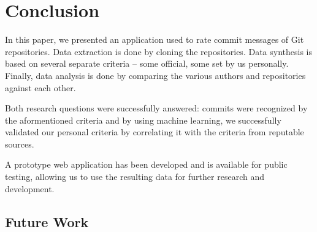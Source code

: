 \section{Conclusion}
\label{sec:conclusion}

In this paper, we presented an application used to rate commit messages of Git repositories. Data extraction is done by cloning the repositories. Data synthesis is based on several separate criteria -- some official, some set by us personally. Finally, data analysis is done by comparing the various authors and repositories against each other.

Both research questions were successfully answered: commits were recognized by the aformentioned criteria and by using machine learning, we successfully validated our personal criteria by correlating it with the criteria from reputable sources.

A prototype web application has been developed and is available for public testing, allowing us to use the resulting data for further research and development.


\subsection{Future Work}
\label{sec:future-work}

